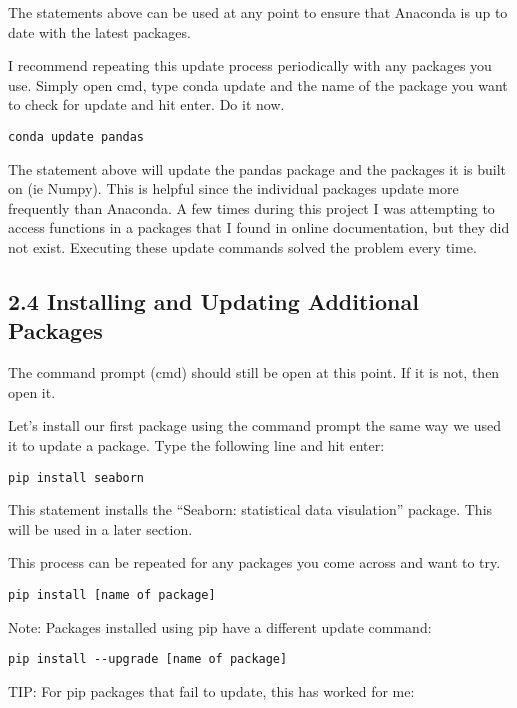 \documentclass{article}
\begin{document}
The statements above can be used at any point to ensure that Anaconda is
up to date with the latest packages.

I recommend repeating this update process periodically with any packages
you use. Simply open cmd, type conda update and the name of the package
you want to check for update and hit enter. Do it now.

\begin{verbatim}
conda update pandas
\end{verbatim}

The statement above will update the pandas package and the packages it
is built on (ie Numpy). This is helpful since the individual packages
update more frequently than Anaconda. A few times during this project I
was attempting to access functions in a packages that I found in online
documentation, but they did not exist. Executing these update commands
solved the problem every time.


    \subsection{2.4 Installing and Updating Additional Packages}


    The command prompt (cmd) should still be open at this point. If it is
not, then open it.

Let's install our first package using the command prompt the same way we
used it to update a package. Type the following line and hit enter:

\begin{verbatim}
pip install seaborn
\end{verbatim}

This statement installs the ``Seaborn: statistical data visulation''
package. This will be used in a later section.

This process can be repeated for any packages you come across and want
to try.

\begin{verbatim}
pip install [name of package]
\end{verbatim}

Note: Packages installed using pip have a different update command:

\begin{verbatim}
pip install --upgrade [name of package]
\end{verbatim}

TIP: For pip packages that fail to update, this has worked for me:
\end{document}
